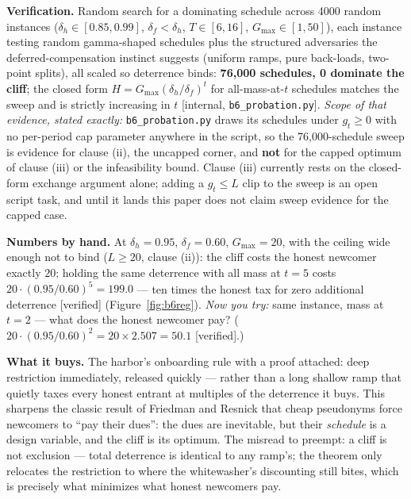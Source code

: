 \documentclass[11pt,a4paper]{article}
\begin{document}
\begin{thebox}
\textbf{Verification.} Random search for a dominating schedule across 4000 random instances
($\delta_h\in[0.85,0.99]$, $\delta_f<\delta_h$, $T\in[6,16]$, $G_{\max}\in[1,50]$), each instance testing random gamma-shaped
schedules plus the structured adversaries the deferred-compensation instinct suggests (uniform ramps, pure back-loads, two-point
splits), all scaled so deterrence binds: \textbf{76{,}000 schedules, 0 dominate the cliff}; the closed form
$H=G_{\max}(\delta_h/\delta_f)^t$ for all-mass-at-$t$ schedules matches the sweep and is strictly increasing in $t$ [internal,
\texttt{b6\_\allowbreak probation.py}]. \emph{Scope of that evidence, stated exactly:} \texttt{b6\_\allowbreak probation.py} draws its schedules under
$g_t\ge0$ with no per-period cap parameter anywhere in the script, so the 76{,}000-schedule sweep is evidence for clause (ii), the
uncapped corner, and \textbf{not} for the capped optimum of clause (iii) or the infeasibility bound. Clause (iii) currently rests on
the closed-form exchange argument alone; adding a $g_t\le L$ clip to the sweep is an open script task, and until it lands this
paper does not claim sweep evidence for the capped case.
\end{thebox}

\textbf{Numbers by hand.} At $\delta_h=0.95$, $\delta_f=0.60$, $G_{\max}=20$, with the ceiling wide enough not to bind ($L\ge20$,
clause (ii)): the cliff costs the honest newcomer exactly $20$;
holding the same deterrence with all mass at $t=5$ costs $20\cdot(0.95/0.60)^5=199.0$ --- ten times the honest tax for zero
additional deterrence [verified] (Figure~\ref{fig:b6reg}). \emph{Now you try:} same instance, mass at $t=2$ --- what does the honest newcomer pay?
($20\cdot(0.95/0.60)^2=20\times 2.507=50.1$ [verified].)



\textbf{What it buys.} The harbor's onboarding rule with a proof attached: deep restriction immediately, released quickly ---
rather than a long shallow ramp that quietly taxes every honest entrant at multiples of the deterrence it buys. This sharpens the
classic result of Friedman and Resnick \cite{friedman-resnick} that cheap pseudonyms force newcomers to ``pay their dues'': the
dues are inevitable, but their \emph{schedule} is a design variable, and the cliff is its optimum. The misread to preempt: a cliff
is not exclusion --- total deterrence is identical to any ramp's; the theorem only relocates the restriction to where the
whitewasher's discounting still bites, which is precisely what minimizes what honest newcomers pay.
\end{document}
